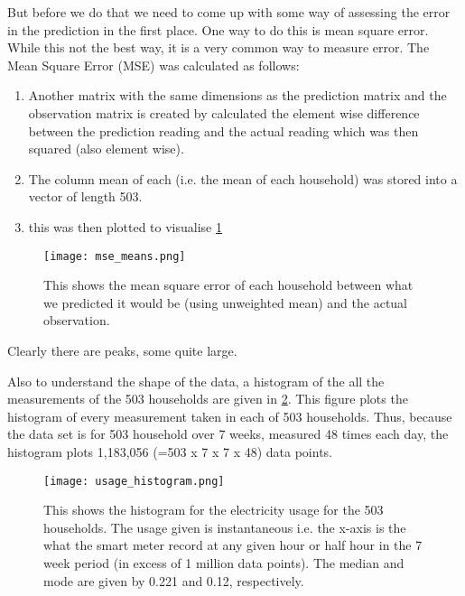 \documentclass[a4paper]{article}
\begin{document}
But before we do that we need to come up with some way of assessing the error in the prediction in the first place. One way to do this is mean square error. While this not the best way, it is a very common way to measure error. 
The Mean Square Error (MSE) was calculated as follows:
\begin{enumerate}
\item Another matrix with the same dimensions as the prediction matrix and the observation matrix is created by calculated the element wise difference between the prediction reading and the actual reading which was then squared (also element wise).
\item The column mean of each (i.e. the mean of each household) was stored into a vector of length 503.
\item this was then plotted to visualise \ref{fig:mse_means}
\end{enumerate}

\begin{figure}
\centering
\texttt{[image: mse\_means.png]}
\caption{\label{fig:mse_means} This shows the mean square error of each household between what we predicted it would be (using unweighted mean) and the actual observation.}
\end{figure}

Clearly there are peaks, some quite large.

Also to understand the shape of the data, a histogram of the all the measurements of the 503 households are given in \ref{fig:hist}. This figure plots the histogram of every measurement taken in each of 503 households. Thus, because the data set is for 503 household over 7 weeks, measured 48 times each day, the histogram plots 1,183,056 (=503 x 7 x 7 x 48) data points.

\begin{figure}
\centering
\texttt{[image: usage\_histogram.png]}
\caption{\label{fig:hist} This shows the histogram for the electricity usage for the 503 households. The usage given is instantaneous i.e. the x-axis is the what the smart meter record at any given hour or half hour in the 7 week period (in excess of 1 million data points). The median and mode are given by 0.221 and 0.12, respectively.}
\end{figure}
\end{document}
